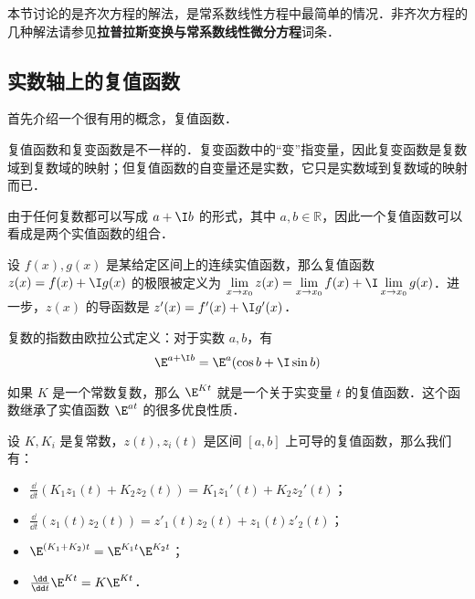 

本节讨论的是齐次方程的解法，是常系数线性方程中最简单的情况．非齐次方程的几种解法请参见\textbf{拉普拉斯变换与常系数线性微分方程}词条．


\subsection{实数轴上的复值函数}

首先介绍一个很有用的概念，复值函数．

复值函数和复变函数是不一样的．复变函数中的“变”指变量，因此复变函数是复数域到复数域的映射；但复值函数的自变量还是实数，它只是实数域到复数域的映射而已．

由于任何复数都可以写成 $a+\I b$ 的形式，其中 $a, b\in\mathbb{R}$，因此一个复值函数可以看成是两个实值函数的组合．

设 $f(x), g(x)$ 是某给定区间上的连续实值函数，那么复值函数 $z(x)=f(x)+\I g(x)$ 的极限被定义为 $\lim\limits_{x\to x_0}z(x)=\lim\limits_{x\to x_0}f(x)+\I\lim\limits_{x\to x_0}g(x)$．进一步，$z(x)$ 的导函数是 $z'(x)=f'(x)+\I g'(x)$．

复数的指数由欧拉公式定义：对于实数 $a, b$，有
\begin{equation}
\E^{a+\I b}=\E^a(\cos b+\I\sin b)
\end{equation}

如果 $K$ 是一个常数复数，那么 $\E^{Kt}$ 就是一个关于实变量 $t$ 的复值函数．这个函数继承了实值函数 $\E^{at}$ 的很多优良性质．

\begin{theorem}{}
设 $K, K_i$ 是复常数，$z(t), z_i(t)$ 是区间 $[a, b]$ 上可导的复值函数，那么我们有：
\begin{itemize}
\item $\frac{\dd }{\dd t}(K_1z_1(t)+K_2z_2(t))=K_1z_1'(t)+K_2z_2'(t)$；
\item $\frac{\dd}{\dd t}(z_1(t)z_2(t))=z'_1(t)z_2(t)+z_1(t)z'_2(t)$；
\item $\E^{(K_1+K_2)t}=\E^{K_1t}\E^{K_2t}$；
\item $\frac{\dd }{\dd t}\E^{Kt}=K\E^{Kt}$．
\end{itemize}
\end{theorem}

